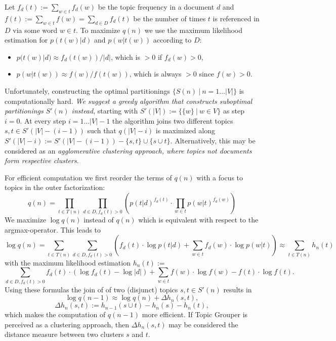 \documentclass[10pt, a4paper, oneside]{article}
\begin{document}
Let $f_d(t) := \sum_{w \in t} f_d(w)$ be the topic frequency in a document $d$ and $f(t) := \sum_{w \in t} f(w) = \sum_{d \in D} f_d(t)$ be
the number of times $t$ is referenced in $D$ via some word $w \in t$.
To maximize $q(n)$ we use the maximum likelihood estimation for $p(t(w) | d)$ and $p(w | t(w))$ according to $D$:
\begin{itemize}
\item $p(t(w) | d) \approx f_d(t(w)) / |d|$, which is $> 0$ if $f_d(w) > 0$,
\item $p(w | t(w)) \approx f(w) / f(t(w))$, which is always $> 0$ since $f(w) > 0$. 
\end{itemize}

Unfortunately, constructing the optimal partitionings $\{ S(n)\ |\ n = 1\dots|V| \}$ is computationally hard.
\emph{We suggest a greedy algorithm that constructs suboptimal partitionings $S'(n)$ instead}, starting with $S'(|V|) := \{ \{ w \}\ |\ w \in V \}$ as step $i = 0$.
At every step $i = 1\dots|V| - 1$ the algorithm joins two different topics $s,t \in S'(|V| - (i - 1))$ such that
$q(|V| - i)$ is maximized along $S'(|V| - i) := S'(|V| - (i - 1)) - \{s, t\} \cup \{ s \cup t \}$.
Alternatively, this may be considered as an \emph{agglomerative clustering approach, where topics not documents form respective clusters}. 

For efficient computation we first reorder the terms of $q(n)$ with a focus to topics in the outer factorization:
\[ q(n) = \prod_{t \in T(n)} \prod_{d \in D, f_d(t) > 0} (p(t | d)^{f_d(t)} \cdot \prod_{w\in t}p(w | t)^{f_d(w)})\]
We maximize $\log q(n)$ instead of $q(n)$ which is equivalent with respect to the argmax-operator. This leads to
\[ \log q(n) = \sum_{t \in T(n)} \sum_{d \in D, f_d(t) > 0} (f_d(t) \cdot \log p(t | d) + \sum_{w\in t} f_d(w) \cdot \log p(w | t)) \approx \sum_{t \in T(n)} h_n(t) \]
with the maximum likelihood estimation $h_n(t) :=$
\begin{equation} 
\label{eq:hnt} 
\sum_{d \in D, f_d(t) > 0} f_d(t) \cdot (\log f_d(t) - \log |d|) + \sum_{w\in t} f(w) \cdot \log f(w) - f(t) \cdot \log f(t).
\end{equation}
Using these formulas the join of of two (disjunct) topics $s, t \in S'(n)$ results in
\[ \log q(n - 1) \approx \log q(n) + \Delta h_n(s,t),\]  
\[\Delta h_n(s,t) := h_{n - 1}(s \cup t) - h_n(s) - h_n(t), \]
which makes the computation of $q(n - 1)$ more efficient.
If Topic Grouper is perceived as a clustering approach, then $\Delta h_n(s,t)$ may be considered the distance measure between two clusters $s$ and $t$.
\end{document}
